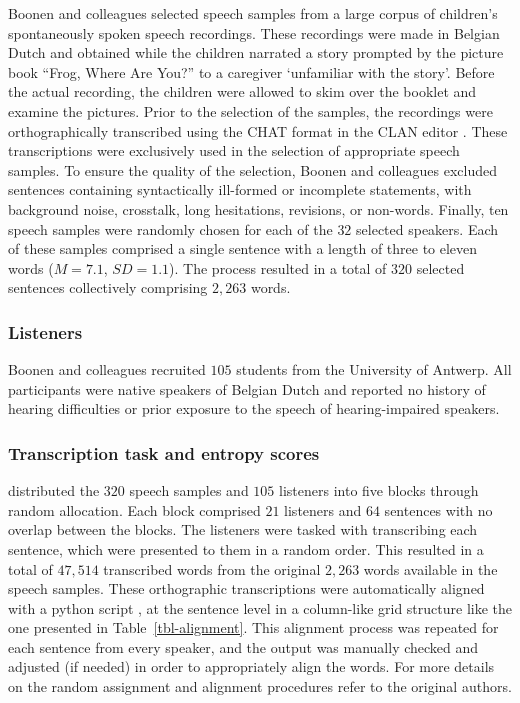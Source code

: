 \documentclass[
  authoryear,
  preprint,
  1p]{elsarticle}
\begin{document}
Boonen and colleagues selected speech samples from a large corpus of
children's spontaneously spoken speech recordings. These recordings were
made in Belgian Dutch and obtained while the children narrated a story
prompted by the picture book ``Frog, Where Are You?'' \citep{Mayer_1969}
to a caregiver `unfamiliar with the story'. Before the actual recording,
the children were allowed to skim over the booklet and examine the
pictures. Prior to the selection of the samples, the recordings were
orthographically transcribed using the CHAT format in the CLAN editor
\citep{MacWhinney_2020}. These transcriptions were exclusively used in
the selection of appropriate speech samples. To ensure the quality of
the selection, Boonen and colleagues excluded sentences containing
syntactically ill-formed or incomplete statements, with background
noise, crosstalk, long hesitations, revisions, or non-words. Finally,
ten speech samples were randomly chosen for each of the \(32\) selected
speakers. Each of these samples comprised a single sentence with a
length of three to eleven words (\(M=7.1\), \(SD=1.1\)). The process
resulted in a total of \(320\) selected sentences collectively
comprising \(2,263\) words.

\subsubsection{Listeners}\label{sec-M-L}

Boonen and colleagues recruited \(105\) students from the University of
Antwerp. All participants were native speakers of Belgian Dutch and
reported no history of hearing difficulties or prior exposure to the
speech of hearing-impaired speakers.

\subsubsection{Transcription task and entropy scores}\label{sec-M-TS}

\citet{Boonen_et_al_2023} distributed the \(320\) speech samples and
\(105\) listeners into five blocks through random allocation. Each block
comprised \(21\) listeners and \(64\) sentences with no overlap between
the blocks. The listeners were tasked with transcribing each sentence,
which were presented to them in a random order. This resulted in a total
of \(47,514\) transcribed words from the original \(2,263\) words
available in the speech samples. These orthographic transcriptions were
automatically aligned with a python script \citep{Boonen_et_al_2023}, at
the sentence level in a column-like grid structure like the one
presented in Table~\ref{tbl-alignment}. This alignment process was
repeated for each sentence from every speaker, and the output was
manually checked and adjusted (if needed) in order to appropriately
align the words. For more details on the random assignment and alignment
procedures refer to the original authors.
\end{document}
